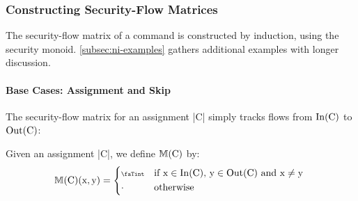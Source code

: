 \subsubsection{Constructing Security-Flow Matrices}%
\label{subsec:construction}

The security-flow matrix of a command is constructed by induction, using the
security monoid. \autoref{subsec:ni-examples} gathers additional examples with
longer discussion.

\paragraph{Base Cases: Assignment and Skip} The security-flow matrix for an
assignment \prc|C| simply tracks flows from $\In(\prc|C|)$ to $\Out(\prc|C|)$:

\begin{definition}[Assignment]%
\label{def:assignment}
Given an assignment \prc|C|, we define \(\sfm{\prc|C|}\) by:
\[
\sfm{\prc|C|}(\prc|x|,\prc|y|)=
\begin{dcases*}
\vi & if $\prc|x| \in \In(\prc|C|)$, $\prc|y| \in \Out(\prc|C|)$ and $\prc|x| \neq \prc|y|$ \\
\nv & otherwise
\end{dcases*}
\]
\end{definition}


